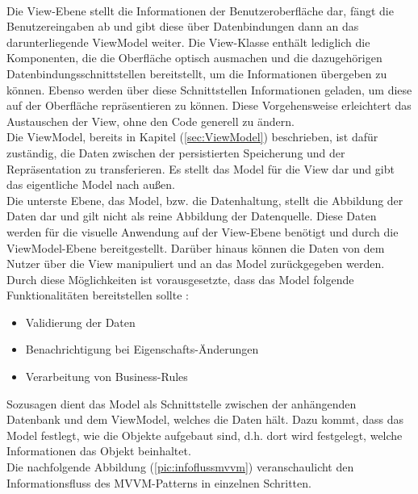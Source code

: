 \\
Die View-Ebene stellt die Informationen der Benutzeroberfläche dar, fängt die Benutzereingaben ab 
und gibt diese über Datenbindungen dann an das darunterliegende ViewModel weiter. Die View-Klasse enthält lediglich die Komponenten, die 
die Oberfläche optisch ausmachen und die dazugehörigen Datenbindungsschnittstellen bereitstellt, um die Informationen übergeben zu können.
Ebenso werden über diese Schnittstellen Informationen geladen, um diese auf der Oberfläche repräsentieren zu können. 
Diese Vorgehensweise erleichtert das Austauschen der View, ohne den Code generell zu ändern. 
\\ 
\linebreak 
Die ViewModel, bereits in Kapitel (\ref{sec:ViewModel}) beschrieben, ist dafür zuständig, die Daten zwischen der persistierten Speicherung 
und der Repräsentation zu transferieren. Es stellt das Model für die View dar und gibt das eigentliche Model nach außen.
\\ 
\linebreak 
Die unterste Ebene, das Model, bzw. die Datenhaltung, stellt die Abbildung der Daten dar und gilt nicht als reine Abbildung der Datenquelle. 
Diese Daten werden für die visuelle Anwendung auf der View-Ebene benötigt und durch die ViewModel-Ebene bereitgestellt. Darüber hinaus können die 
Daten von dem Nutzer über die View manipuliert und an das Model zurückgegeben werden. Durch diese Möglichkeiten ist vorausgesetzte, dass das Model 
folgende Funktionalitäten bereitstellen sollte \cite{mvvmAufbau.2016}:
\begin{itemize}
    \item Validierung der Daten
    \item  Benachrichtigung bei Eigenschafts-Änderungen
    \item Verarbeitung von Business-Rules
\end{itemize} 
Sozusagen dient das Model als Schnittstelle zwischen der anhängenden Datenbank und dem ViewModel, welches die Daten hält. 
Dazu kommt, dass das Model festlegt, wie die Objekte aufgebaut sind, d.h. dort wird festgelegt, welche Informationen das Objekt beinhaltet. 
\\ 
\linebreak
Die nachfolgende Abbildung (\ref{pic:infoflussmvvm}) veranschaulicht den Informationsfluss des MVVM-Patterns in einzelnen Schritten.
